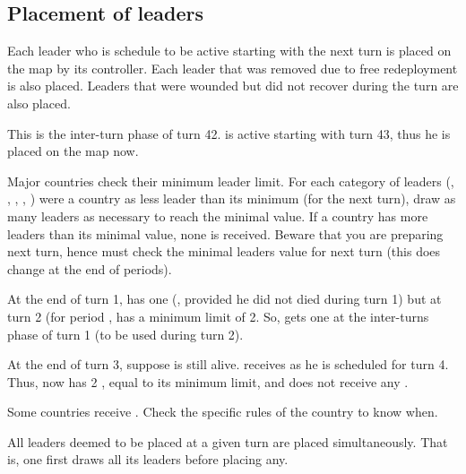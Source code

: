 \subsection{Placement of leaders}
Each leader who is schedule to be active starting with the next turn is placed
on the map by its controller.
\bparag Each leader that was removed due to free redeployment is also placed.
\bparag Leaders that were wounded but did not recover during the turn are also
placed.

\begin{exemple}
  This is the inter-turn phase of turn 42.  is
  active starting with turn 43, thus he is placed on the map now.
\end{exemple}

\aparag[Anonymous] Major countries check their minimum leader limit.
\bparag For each category of leaders (\LeaderG, \LeaderA, \LeaderE, \LeaderC,
\LeaderGov) were a country as less leader than its minimum (for the next
turn), draw as many leaders as necessary to reach the minimal value.
\bparag If a country has more leaders than its minimal value, none is
received.
\bparag Beware that you are preparing next turn, hence must check the minimal
leaders value for next turn (this does change at the end of periods).

\begin{exemple}
  At the end of turn 1, \RUS has one \LeaderG (,
  provided he did not died during turn 1) but at turn 2 (for period
  , \RUS has a minimum limit of 2\LeaderG. So, \RUS gets one
  \anonyme\LeaderG at the inter-turns phase of turn 1 (to be used during turn
  2).

  \smallskip

  At the end of turn 3, suppose \leaderShchenya is still alive. \RUS receives
   as he is scheduled for turn 4. Thus, \RUS now
  has 2 \LeaderG, equal to its minimum limit, and does not receive any
  \anonyme\LeaderG.
\end{exemple}

\aparag[Missionaries] Some countries receive \LeaderMis. Check the specific
rules of the country to know when.

\aparag[Placement] All leaders deemed to be placed at a given turn are placed
simultaneously. That is, one first draws all its \anonyme leaders before
placing any.

